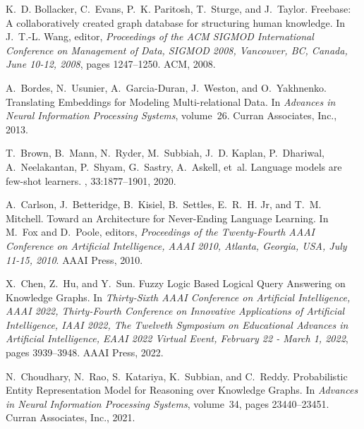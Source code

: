 \documentclass[11pt]{article}
\begin{document}
\begin{thebibliography}{10}
\begin{small}
K.~D. Bollacker, C.~Evans, P.~K. Paritosh, T.~Sturge, and J.~Taylor.
\newblock Freebase: A collaboratively created graph database for structuring
  human knowledge.
\newblock In J.~T.-L. Wang, editor, {\em Proceedings of the {{ACM SIGMOD
  International Conference}} on {{Management}} of {{Data}}, {{SIGMOD}} 2008,
  {{Vancouver}}, {{BC}}, {{Canada}}, {{June}} 10-12, 2008}, pages 1247--1250.
  {ACM}, 2008.

A.~Bordes, N.~Usunier, A.~{Garcia-Duran}, J.~Weston, and O.~Yakhnenko.
\newblock Translating {{Embeddings}} for {{Modeling Multi-relational Data}}.
\newblock In {\em Advances in {{Neural Information Processing Systems}}},
  volume~26. {Curran Associates, Inc.}, 2013.

T.~Brown, B.~Mann, N.~Ryder, M.~Subbiah, J.~D. Kaplan, P.~Dhariwal,
  A.~Neelakantan, P.~Shyam, G.~Sastry, A.~Askell, et~al.
\newblock Language models are few-shot learners.
,
  33:1877--1901, 2020.

A.~Carlson, J.~Betteridge, B.~Kisiel, B.~Settles, E.~R.~H. Jr, and T.~M.
  Mitchell.
\newblock Toward an {{Architecture}} for {{Never-Ending Language Learning}}.
\newblock In M.~Fox and D.~Poole, editors, {\em Proceedings of the
  {{Twenty-Fourth AAAI Conference}} on {{Artificial Intelligence}}, {{AAAI}}
  2010, {{Atlanta}}, {{Georgia}}, {{USA}}, {{July}} 11-15, 2010}. {AAAI Press},
  2010.

X.~Chen, Z.~Hu, and Y.~Sun.
\newblock Fuzzy {{Logic Based Logical Query Answering}} on {{Knowledge
  Graphs}}.
\newblock In {\em Thirty-{{Sixth AAAI Conference}} on {{Artificial
  Intelligence}}, {{AAAI}} 2022, {{Thirty-Fourth Conference}} on {{Innovative
  Applications}} of {{Artificial Intelligence}}, {{IAAI}} 2022, {{The Twelveth
  Symposium}} on {{Educational Advances}} in {{Artificial Intelligence}},
  {{EAAI}} 2022 {{Virtual Event}}, {{February}} 22 - {{March}} 1, 2022}, pages
  3939--3948. {AAAI Press}, 2022.

N.~Choudhary, N.~Rao, S.~Katariya, K.~Subbian, and C.~Reddy.
\newblock Probabilistic {{Entity Representation Model}} for {{Reasoning}} over
  {{Knowledge Graphs}}.
\newblock In {\em Advances in {{Neural Information Processing Systems}}},
  volume~34, pages 23440--23451. {Curran Associates, Inc.}, 2021.


\end{small}
\end{thebibliography}
\end{document}

